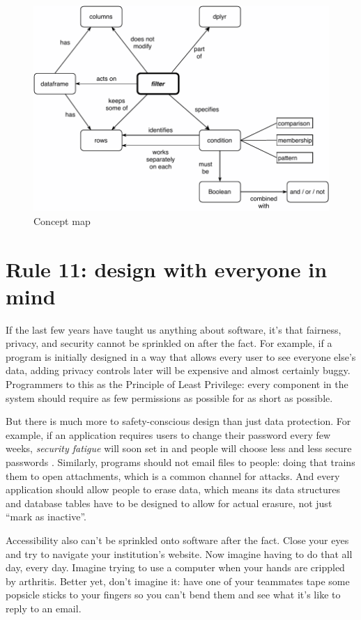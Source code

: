 \documentclass[10pt,letterpaper]{article}
\begin{document}
\begin{figure}
  \centering
  \includegraphics[scale=0.6]{concept-map.pdf}
  \caption{Concept map}
  \label{concept-map}
\end{figure}

\section*{Rule 11: design with everyone in mind}

If the last few years have taught us anything about software,
it's that fairness, privacy, and security cannot be sprinkled on after the fact.
For example,
if a program is initially designed in a way that allows every user to see everyone else's data,
adding privacy controls later will be expensive and almost certainly buggy.
Programmers to this as the Principle of Least Privilege:
every component in the system should require as few permissions as possible
for as short as possible.

But there is much more to safety-conscious design than just data protection.
For example,
if an application requires users to change their password every few weeks,
\emph{security fatigue} will soon set in
and people will choose less and less secure passwords \cite{Smalls2021}.
Similarly,
programs should not email files to people:
doing that trains them to open attachments,
which is a common channel for attacks.
And every application should allow people to erase data,
which means its data structures and database tables have to be designed to allow for actual erasure,
not just ``mark as inactive''.

Accessibility also can't be sprinkled onto software after the fact.
Close your eyes and try to navigate your institution's website.
Now imagine having to do that all day, every day.
Imagine trying to use a computer when your hands are crippled by arthritis.
Better yet, don't imagine it:
have one of your teammates tape some popsicle sticks to your fingers so you can't bend them
and see what it's like to reply to an email.
\end{document}

